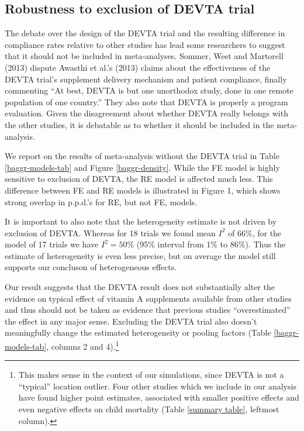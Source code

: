 \documentclass[12pt]{article}
\begin{document}
\subsection{Robustness to exclusion of DEVTA trial}

The debate over the design of the DEVTA trial and the resulting difference in compliance rates relative to other studies has lead some researchers to suggest that it should not be included in meta-analyses. Sommer, West and Martorell (2013) dispute Awasthi et al.'s (2013) claims about the effectiveness of the DEVTA trial's supplement delivery mechanism and patient compliance, finally commenting ``At best, DEVTA is but one unorthodox study, done in one remote population of one country.'' 
They also note that DEVTA is properly a program evaluation. Given the disagreement about whether DEVTA really belongs with the other studies, it is debatable as to whether it should be included in the meta-analysis.

We report on the results of meta-analysis without the DEVTA trial in Table \ref{baggr-models-tab} and Figure \ref{baggr-density}. While the FE model is highly sensitive to exclusion of DEVTA, the RE model is affected much less. This difference between FE and RE models is illustrated in Figure 1, which shows strong overlap in p.p.d.'s for RE, but not FE, models.

It is important to also note that the heterogeneity estimate is not driven by exclusion of DEVTA. Whereas for 18 trials we found mean $I^2$ of 66\%, for the model of 17 trials we have $I^2 = 50\%$ (95\% interval from 1\% to 86\%). Thus the estimate of heterogeneity is even less precise, but on average the model still supports our concluson of heterogeneous effects.

Our result suggests that the DEVTA result does not substantially alter the evidence on typical effect of vitamin A supplements available from other studies and thus should not be taken as evidence that previous studies ``overestimated'' the effect in any major sense. Excluding the DEVTA trial also doesn't meaningfully change the estimated heterogeneity or pooling factors (Table \ref{baggr-models-tab}, columns 2 and 4).\footnote{This makes sense in the context of our simulations, since DEVTA is not a ``typical'' location outlier. Four other studies which we include in our analysis have found higher point estimates, associated with smaller positive effects and even negative effects on child mortality (Table \ref{summary table}, leftmost column).}
\end{document}
